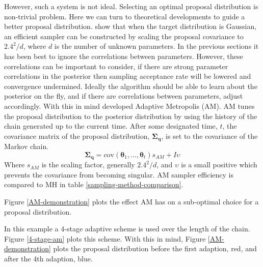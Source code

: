 However, such a system is not ideal. Selecting an optimal proposal distribution is non-trivial problem. Here we can turn to theoretical developments to guide a better proposal distribution. \citet{Gelman1996} show that when the target distribution is Gaussian, an efficient sampler can be constructed by scaling the proposal covariance to $2.4^2/d$, where $d$ is the number of unknown parameters. In the previous sections it has been best to ignore the correlations between parameters. However, these correlations can be important to consider, if there are strong parameter correlations in the posterior then sampling acceptance rate will be lowered and convergence undermined. Ideally the algorithm should be able to learn about the posterior on the fly, and if there are correlations between parameters, adjust accordingly. With this in mind \citet{haario2001} developed Adaptive Metropolis (AM). AM tunes the proposal distribution to the posterior distribution by using the history of the chain generated up to the current time. After some designated time, $t$, the covariance matrix of the proposal distribution, $\bm{\Sigma_q}$, is set to the covariance of the Markov chain. 
\begin{equation}
\bm{\Sigma_q} = \text{cov}(\bm{\theta}_1,\dots,\bm{\theta}_t)s_{AM} + I\upsilon
\end{equation}
Where $s_{AM}$ is the scaling factor, generally $2.4^2/d$, and $\upsilon$ is a small positive which prevents the covariance from becoming singular. AM sampler efficiency is compared to MH in table \ref{sampling-method-comparison}.\par

Figure \ref{AM-demonstration} plots the effect AM has on a sub-optimal choice for a proposal distribution.\par

In this example a 4-stage adaptive scheme is used over the length of the chain. Figure \ref{4-stage-am} plots this scheme. With this in mind, Figure \ref{AM-demonstration} plots the proposal distribution before the first adaption, red, and after the 4th adaption, blue. \\
\linebreak
\linebreak
\linebreak


